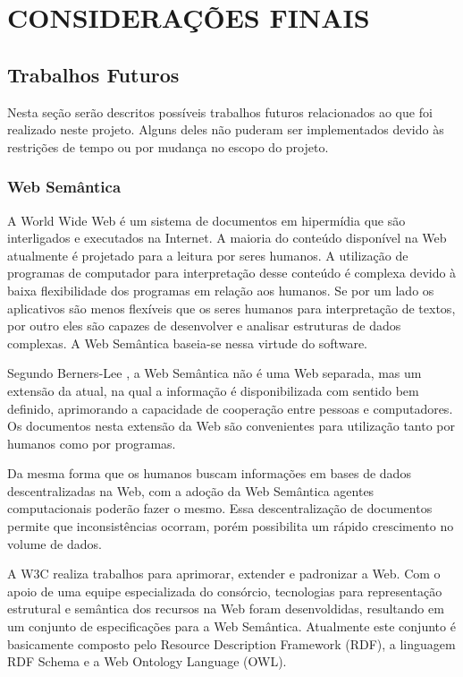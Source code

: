 \chapter{CONSIDERAÇÕES FINAIS} %
\label{cha:consideracoes_finais}

\section{Trabalhos Futuros}
\label{sec:trabalho_futuros}

 Nesta seção serão descritos possíveis trabalhos futuros relacionados ao que foi realizado neste projeto. Alguns deles não puderam ser implementados devido às restrições de tempo ou por mudança no escopo do projeto.

\subsection{Web Semântica} %
\label{sub:web_semantica}

 A World Wide Web é um sistema de documentos em hipermídia que são interligados e executados na Internet. A maioria do conteúdo disponível na Web atualmente é projetado para a leitura por seres humanos. A utilização de programas de computador para interpretação desse conteúdo é complexa devido à baixa flexibilidade dos programas em relação aos humanos. Se por um lado os aplicativos são menos flexíveis que os seres humanos para interpretação de textos, por outro eles são capazes de desenvolver e analisar estruturas de dados complexas. A Web Semântica baseia-se nessa virtude do software. 

 Segundo Berners-Lee \cite{bemerslee2001sw}, a Web Semântica não é uma Web separada, mas um extensão da atual, na qual a informação é disponibilizada com sentido bem definido, aprimorando a capacidade de cooperação entre pessoas e computadores. Os documentos nesta extensão da Web são convenientes para utilização tanto por humanos como por programas.

 Da mesma forma que os humanos buscam informações em bases de dados descentralizadas na Web, com a adoção da Web Semântica agentes computacionais poderão fazer o mesmo. Essa descentralização de documentos permite que inconsistências ocorram, porém possibilita um rápido crescimento no volume de dados.

 A W3C realiza trabalhos para aprimorar, extender e padronizar a Web. Com o apoio de uma equipe especializada do consórcio, tecnologias para representação estrutural e semântica dos recursos na Web foram desenvoldidas, resultando em um conjunto de especificações para a Web Semântica. Atualmente este conjunto é basicamente composto pelo Resource Description Framework (RDF), a linguagem RDF Schema e a Web Ontology Language (OWL).

